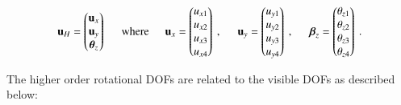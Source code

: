 \begin{equation} 
\mathbf{u}_H = 
\begin{pmatrix}
\mathbf{u}_x \\ 
\mathbf{u}_y \\
\boldsymbol{\theta}_z
\end{pmatrix} 
\hspace{5mm}
\text{where}
\hspace{5mm}
\mathbf{u}_x = 
\begin{pmatrix}
u_{x1} \\
u_{x2} \\
u_{x3} \\
u_{x4} 
\end{pmatrix}
\ ,\hspace{5mm}
\mathbf{u}_y = 
\begin{pmatrix}
u_{y1} \\
u_{y2} \\
u_{y3} \\
u_{y4} 
\end{pmatrix}
\ ,\hspace{5mm}
\boldsymbol{\beta}_z= 
\begin{pmatrix}
\theta_{z1} \\
\theta_{z2}  \\
\theta_{z3}  \\
\theta_{z4} 
\end{pmatrix}
\label{equation07_2}\ .
\end{equation}

The higher order rotational DOFs are related to the visible DOFs as described below:

